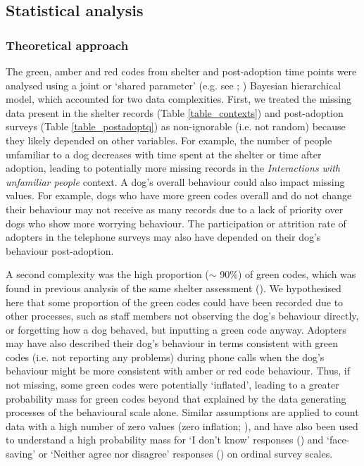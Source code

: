 \documentclass[12pt]{article}
\begin{document}
\subsection{Statistical analysis}

\subsubsection{Theoretical approach}\label{sec_theoretical_approach}
The green, amber and red codes from shelter and post-adoption time points were analysed using a joint or `shared parameter' (e.g. see \cite{vonesh2006}; \cite{tseng2016}) Bayesian hierarchical model, which accounted for two data complexities. First, we treated the missing data present in the shelter records (Table \ref{table_contexts}) and post-adoption surveys (Table \ref{table_postadoptq}) as non-ignorable (i.e. not random) because they likely depended on other variables. For example, the number of people unfamiliar to a dog decreases with time spent at the shelter or time after adoption, leading to potentially more missing records in the \textit{Interactions with unfamiliar people} context. A dog’s overall behaviour could also impact missing values. For example, dogs who have more green codes overall and do not change their behaviour may not receive as many records due to a lack of priority over dogs who show more worrying behaviour. The participation or attrition rate of adopters in the telephone surveys may also have depended on their dog’s behaviour post-adoption.

A second complexity was the high proportion ($\sim$ 90\%) of green codes, which was found in previous analysis of the same shelter assessment (\cite{goold2017modelling}). We hypothesised here that some proportion of the green codes could have been recorded due to other processes, such as staff members not observing the dog’s behaviour directly, or forgetting how a dog behaved, but inputting a green code anyway. Adopters may have also described their dog’s behaviour in terms consistent with green codes (i.e. not reporting any problems) during phone calls when the dog’s behaviour might be more consistent with amber or red code behaviour. Thus, if not missing, some green codes were potentially ‘inflated’, leading to a greater probability mass for green codes beyond that explained by the data generating processes of the behavioural scale alone. Similar assumptions are applied to count data with a high number of zero values (zero inflation; \cite{lambert1992}), and have also been used to understand a high probability mass for ‘I don’t know’ responses (\cite{kelley2008}) and ‘face-saving’ or ‘Neither agree nor disagree’ responses (\cite{bagozzi2012}) on ordinal survey scales.
\end{document}
